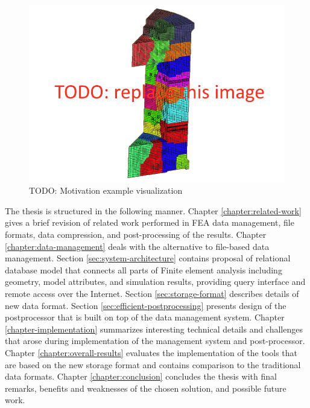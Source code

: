 \begin{figure}[H]
\centering
\includegraphics[width=\textwidth]{figures/motivation-example}
\decoRule
\caption[TODO: ]{TODO: Motivation example visualization}
\label{fig:motivation-example}
\end{figure}

The thesis is structured in the following manner. Chapter \ref{chapter:related-work} gives a brief revision of related work performed in FEA data management, file formats, data compression, and post-processing of the results. Chapter \ref{chapter:data-management} deals with the alternative to file-based data management. Section \ref{sec:system-architecture} contains proposal of relational database model that connects all parts of Finite element analysis including geometry, model attributes, and simulation results, providing query interface and remote access over the Internet. Section \ref{sec:storage-format} describes details of new data format. Section \ref{sec:efficient-postprocessing} presents design of the postprocessor that is built on top of the data management system. Chapter \ref{chapter-implementation} summarizes interesting technical details and challenges that arose during implementation of the management system and post-processor. Chapter \ref{chapter:overall-results} evaluates the implementation of the tools that are based on the new storage format and contains comparison to the traditional data formats. Chapter \ref{chapter:conclusion} concludes the thesis with final remarks, benefits and weaknesses of the chosen solution, and possible future work.


